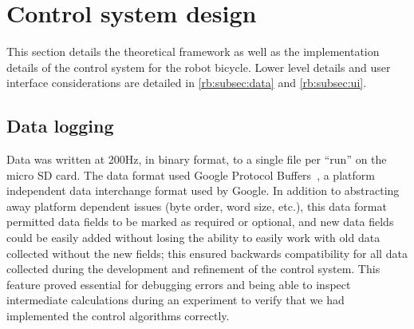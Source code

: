 \section{Control system design} \label{rb:sec:control}
This section details the theoretical framework as well as the implementation
details of the control system for the robot bicycle. Lower level details and
user interface considerations are detailed in \autoref{rb:subsec:data} and
\autoref{rb:subsec:ui}.

\subsection{Data logging} \label{rb:subsec:data}
Data was written at 200Hz, in binary format, to a single file per ``run'' on
the micro SD card. The data format used Google Protocol
Buffers~\cite{GoogleProtoBuf}, a platform independent data interchange format
used by Google. In addition to abstracting away platform dependent issues (byte
order, word size, etc.), this data format permitted data fields to be marked as
required or optional, and new data fields could be easily added without losing
the ability to easily work with old data collected without the new fields; this
ensured backwards compatibility for all data collected during the development
and refinement of the control system. This feature proved essential for
debugging errors and being able to inspect intermediate calculations during an
experiment to verify that we had implemented the control algorithms correctly.

